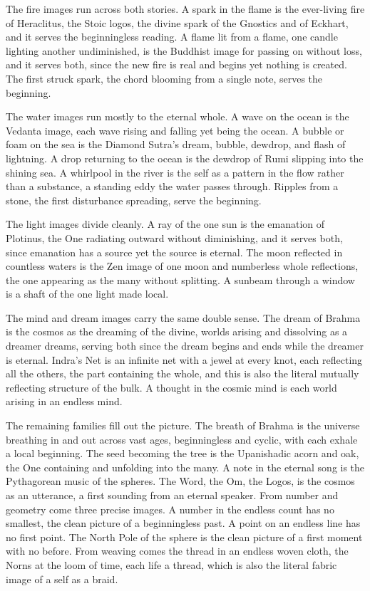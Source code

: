 The fire images run across both stories. A spark in the flame is the ever-living fire of Heraclitus, the Stoic
logos, the divine spark of the Gnostics and of Eckhart, and it serves the beginningless reading. A flame lit from
a flame, one candle lighting another undiminished, is the Buddhist image for passing on without loss, and it
serves both, since the new fire is real and begins yet nothing is created. The first struck spark, the chord
blooming from a single note, serves the beginning.

The water images run mostly to the eternal whole. A wave on the ocean is the Vedanta image, each wave rising and
falling yet being the ocean. A bubble or foam on the sea is the Diamond Sutra's dream, bubble, dewdrop, and flash
of lightning. A drop returning to the ocean is the dewdrop of Rumi slipping into the shining sea. A whirlpool in
the river is the self as a pattern in the flow rather than a substance, a standing eddy the water passes through.
Ripples from a stone, the first disturbance spreading, serve the beginning.

The light images divide cleanly. A ray of the one sun is the emanation of Plotinus, the One radiating outward
without diminishing, and it serves both, since emanation has a source yet the source is eternal. The moon
reflected in countless waters is the Zen image of one moon and numberless whole reflections, the one appearing as
the many without splitting. A sunbeam through a window is a shaft of the one light made local.

The mind and dream images carry the same double sense. The dream of Brahma is the cosmos as the dreaming of the
divine, worlds arising and dissolving as a dreamer dreams, serving both since the dream begins and ends while the
dreamer is eternal. Indra's Net is an infinite net with a jewel at every knot, each reflecting all the others, the
part containing the whole, and this is also the literal mutually reflecting structure of the bulk. A thought in
the cosmic mind is each world arising in an endless mind.

The remaining families fill out the picture. The breath of Brahma is the universe breathing in and out across
vast ages, beginningless and cyclic, with each exhale a local beginning. The seed becoming the tree is the
Upanishadic acorn and oak, the One containing and unfolding into the many. A note in the eternal song is the
Pythagorean music of the spheres. The Word, the Om, the Logos, is the cosmos as an utterance, a first sounding
from an eternal speaker. From number and geometry come three precise images. A number in the endless count has no
smallest, the clean picture of a beginningless past. A point on an endless line has no first point. The North Pole
of the sphere is the clean picture of a first moment with no before. From weaving comes the thread in an endless
woven cloth, the Norns at the loom of time, each life a thread, which is also the literal fabric image of a self
as a braid.


